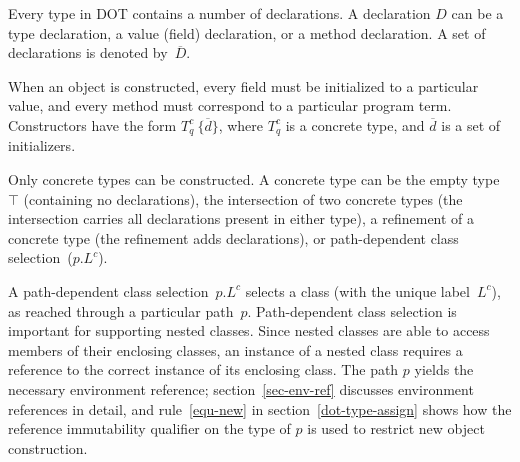 \begin{comment}
		\qquad l=v & \qquad \text{field initialization} & \qquad m:S_q \rightarrow U_q & \quad \text{method declaration} \\
		\qquad m(x)=t & \qquad \text{method initialization} &
			\Gamma ::= \overline{x:T_q} & \text{Environment} \\
		s::=\overline{x \mapsto c} & \text{Store} &
			\multicolumn{2}{l}{\boxed{q,r,u,w \qquad \qquad \qquad \text{Type Qualifier}}}\\
	\end{array}
	\end{equation*}
	\caption{DOT Syntax with Type Qualifiers}
	\label{fig-dot-syntax}
\end{figure}
\end{comment}

Every type in DOT contains a number of declarations. A declaration $D$ can be
a type declaration, a value (field) declaration, or a method declaration.
A set of declarations is denoted by~$\overline{D}$.

When an object is constructed, every field must be initialized
to a particular value, and every method must correspond to a particular program term.
Constructors have the form \mbox{$T_q^c\ \{ \overline{d} \}$},
where \mbox{$T_q^c$} is a concrete type, and \mbox{$\overline{d}$} is
a set of initializers.

Only concrete types can be constructed.
A concrete type can be the empty type~$\top$ (containing no declarations),
the intersection of two concrete types (the intersection carries all declarations present
in either type),
a refinement of a concrete type (the refinement adds declarations),
or path-dependent class selection~(\mbox{$p.L^c$}).

A path-dependent class selection~\mbox{$p.L^c$} selects a class (with
the unique label~\mbox{$L^c$}), as reached through a particular path~$p$.
Path-dependent class selection is important for supporting nested classes.
Since nested classes are able to access members of their enclosing classes,
an instance of a nested class requires a reference to the correct instance of
its enclosing class.
The path $p$ yields the necessary environment reference;
section~\ref{sec-env-ref} discusses environment references in detail,
and rule~\ref{equ-new} in section~\ref{dot-type-assign} shows how the reference immutability
qualifier on the type of $p$ is used to restrict new object construction.

